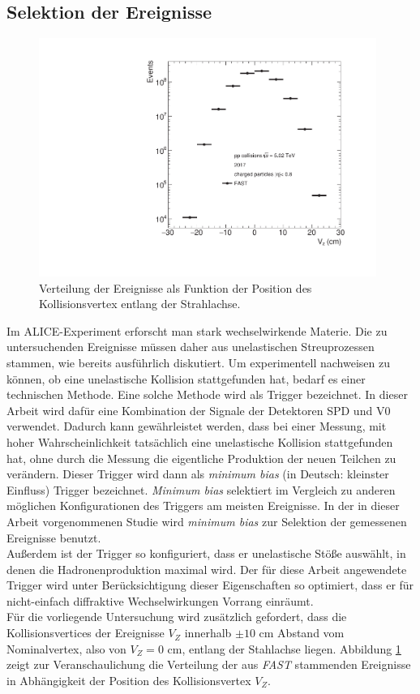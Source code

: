 \documentclass[12pt,a4paper]{report}
\begin{document}
\subsection{Selektion der Ereignisse}
\begin{figure}
\centering
\includegraphics[width=11cm]{Plots/VertexZFAST.pdf} 
\caption{Verteilung der Ereignisse als Funktion der Position des Kollisionsvertex entlang der Strahlachse.}
\label{VertexZ}
\end{figure}
Im ALICE-Experiment erforscht man stark wechselwirkende Materie. Die zu untersuchenden Ereignisse müssen daher aus unelastischen Streuprozessen stammen, wie bereits ausführlich diskutiert. Um experimentell nachweisen zu können, ob eine unelastische Kollision stattgefunden hat, bedarf es einer technischen Methode. Eine solche Methode wird als Trigger bezeichnet. In dieser Arbeit wird dafür eine Kombination der Signale der Detektoren SPD und V0 verwendet. Dadurch kann gewährleistet werden, dass bei einer Messung, mit hoher Wahrscheinlichkeit tatsächlich eine unelastische Kollision stattgefunden hat, ohne durch die Messung die eigentliche Produktion der neuen Teilchen zu verändern. Dieser Trigger wird dann als \textit{minimum bias} (in Deutsch: kleinster Einfluss) Trigger bezeichnet. \textit{Minimum bias} selektiert im Vergleich zu anderen möglichen Konfigurationen des Triggers am meisten Ereignisse. In der in dieser Arbeit vorgenommenen Studie wird \textit{minimum bias} zur Selektion der gemessenen Ereignisse benutzt.\\ 
Außerdem ist der Trigger so konfiguriert, dass er unelastische Stöße auswählt, in denen die Hadronenproduktion maximal wird. Der für diese Arbeit angewendete Trigger wird unter Berücksichtigung dieser Eigenschaften so optimiert, dass er für nicht-einfach diffraktive Wechselwirkungen Vorrang einräumt.\\
Für die vorliegende Untersuchung wird zusätzlich gefordert, dass die Kollisionsvertices der Ereignisse $V_{Z}$ innerhalb $\pm 10$ cm Abstand vom Nominalvertex, also von $V_{Z} = 0$ cm, entlang der Stahlachse liegen. Abbildung \ref{VertexZ} zeigt zur Veranschaulichung die Verteilung der aus \textit{FAST} stammenden Ereignisse in Abhängigkeit der Position des Kollisionsvertex $V_{Z}$.
\end{document}
